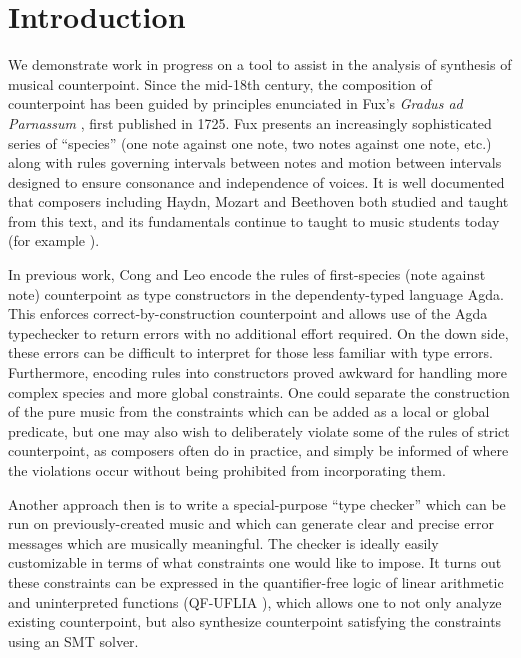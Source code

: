 \documentclass[sigplan,screen]{acmart}
\begin{document}
\section{Introduction}

We demonstrate work in progress on a tool to assist in the analysis of
synthesis of musical counterpoint. Since the mid-18th century, the
composition of counterpoint has been guided by principles enunciated
in Fux's \textit{Gradus ad Parnassum} \citep{Fux1965}, first published
in 1725. Fux presents an increasingly sophisticated series of
``species'' (one note against one note, two notes against one note,
etc.) along with rules governing intervals between notes and motion
between intervals designed to ensure consonance and independence of
voices. It is well documented that composers including Haydn,
Mozart and Beethoven both studied and taught from this text, and its
fundamentals continue to taught to music students today (for example
\cite{Kennan1999, Aldwell2018}).

In previous work, Cong and Leo \citep{CongLeo2019} encode the rules of
first-species (note against note) counterpoint as type constructors in
the dependenty-typed language Agda. This enforces
correct-by-construction counterpoint and allows use of the Agda
typechecker to return errors with no additional effort required. On
the down side, these errors can be difficult to interpret for those
less familiar with type errors. Furthermore, encoding rules into
constructors proved awkward for handling more complex species and
more global constraints. One could separate the construction of the
pure music from the constraints which can be added as a local or
global predicate, but one may also wish to deliberately violate some
of the rules of strict counterpoint, as composers often do in
practice, and simply be informed of where the violations occur without
being prohibited from incorporating them.

Another approach then is to write a special-purpose ``type checker''
which can be run on previously-created music and which can generate
clear and precise error messages which are musically meaningful. The
checker is ideally easily customizable in terms of what constraints
one would like to impose. It turns out these constraints can be
expressed in the quantifier-free logic of linear arithmetic and
uninterpreted functions (QF-UFLIA \cite{Barrett2010}), which allows
one to not only analyze existing counterpoint, but also synthesize
counterpoint satisfying the constraints using an SMT solver.
\end{document}
